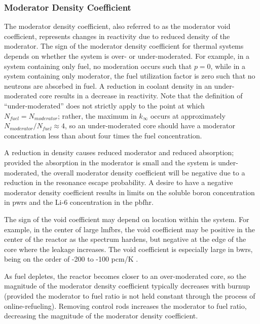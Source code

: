 \subsubsection{Moderator Density Coefficient}
The moderator density coefficient, also referred to as the moderator void coefficient, represents changes in reactivity due to reduced density of the moderator. The sign of the moderator density coefficient for thermal systems depends on whether the system is over- or under-moderated. For example, in a system containing only fuel, no moderation occurs such that \(p=0\), while in a system containing only moderator, the fuel utilization factor is zero such that no neutrons are absorbed in fuel. A reduction in coolant density in an under-moderated core results in a decrease in reactivity. Note that the definition of ``under-moderated'' does not strictly apply to the point at which \(N_{fuel}=N_{moderator}\); rather, the maximum in \(k_\infty\) occurs at approximately \(N_{moderator}/N_{fuel}\approx4\), so an under-moderated core should have a moderator concentration less than about four times the fuel concentration. 

A reduction in density causes reduced moderator and reduced absorption; provided the absorption in the moderator is small and the system is under-moderated, the overall moderator density coefficient will be negative due to a reduction in the resonance escape probability. A desire to have a negative moderator density coefficient results in limits on the soluble boron concentration in \glspl{pwr} and the Li-6 concentration in the \gls{pbfhr}. 

The sign of the void coefficient may depend on location within the system. For example, in the center of large \glspl{lmfbr}, the void coefficient may be positive in the center of the reactor as the spectrum hardens, but negative at the edge of the core where the leakage increases. The void coefficient is especially large in \glspl{bwr}, being on the order of -200 to -100 pcm/K \cite{duderstadt}. 

As fuel depletes, the reactor becomes closer to an over-moderated core, so the magnitude of the moderator density coefficient typically decreases with burnup (provided the moderator to fuel ratio is not held constant through the process of online-refueling). Removing control rods increases the moderator to fuel ratio, decreasing the magnitude of the moderator density coefficient.
